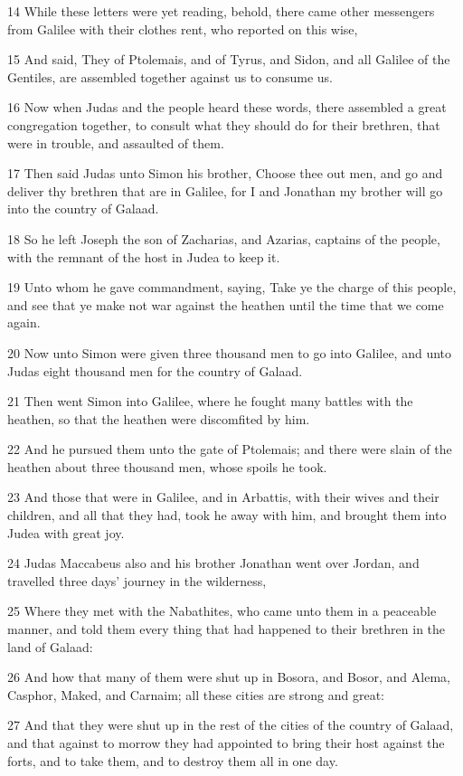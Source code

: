 \par 14 While these letters were yet reading, behold, there came other messengers from Galilee with their clothes rent, who reported on this wise,
\par 15 And said, They of Ptolemais, and of Tyrus, and Sidon, and all Galilee of the Gentiles, are assembled together against us to consume us.
\par 16 Now when Judas and the people heard these words, there assembled a great congregation together, to consult what they should do for their brethren, that were in trouble, and assaulted of them.
\par 17 Then said Judas unto Simon his brother, Choose thee out men, and go and deliver thy brethren that are in Galilee, for I and Jonathan my brother will go into the country of Galaad.
\par 18 So he left Joseph the son of Zacharias, and Azarias, captains of the people, with the remnant of the host in Judea to keep it.
\par 19 Unto whom he gave commandment, saying, Take ye the charge of this people, and see that ye make not war against the heathen until the time that we come again.
\par 20 Now unto Simon were given three thousand men to go into Galilee, and unto Judas eight thousand men for the country of Galaad.
\par 21 Then went Simon into Galilee, where he fought many battles with the heathen, so that the heathen were discomfited by him.
\par 22 And he pursued them unto the gate of Ptolemais; and there were slain of the heathen about three thousand men, whose spoils he took.
\par 23 And those that were in Galilee, and in Arbattis, with their wives and their children, and all that they had, took he away with him, and brought them into Judea with great joy.
\par 24 Judas Maccabeus also and his brother Jonathan went over Jordan, and travelled three days' journey in the wilderness,
\par 25 Where they met with the Nabathites, who came unto them in a peaceable manner, and told them every thing that had happened to their brethren in the land of Galaad:
\par 26 And how that many of them were shut up in Bosora, and Bosor, and Alema, Casphor, Maked, and Carnaim; all these cities are strong and great:
\par 27 And that they were shut up in the rest of the cities of the country of Galaad, and that against to morrow they had appointed to bring their host against the forts, and to take them, and to destroy them all in one day.
